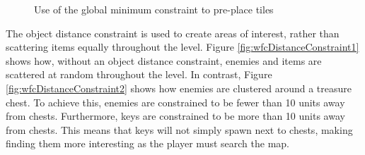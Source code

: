 \begin{figure}[H]
    \centering
    \hfill
    \caption{Use of the global minimum constraint to pre-place tiles \cite{WFC_Automatic_Rules_And_Better_Symmetries}}
    \label{fig:wfcMinimumConstraint}
\end{figure}

The object distance constraint is used to create areas of interest, rather than scattering items equally throughout the level. Figure \ref{fig:wfcDistanceConstraint1} shows how, without an object distance constraint, enemies and items are scattered at random throughout the level. In contrast, Figure \ref{fig:wfcDistanceConstraint2} shows how enemies are clustered around a treasure chest. To achieve this, enemies are constrained to be fewer than 10 units away from chests. Furthermore, keys are constrained to be more than 10 units away from chests. This means that keys will not simply spawn next to chests, making finding them more interesting as the player must search the map.

